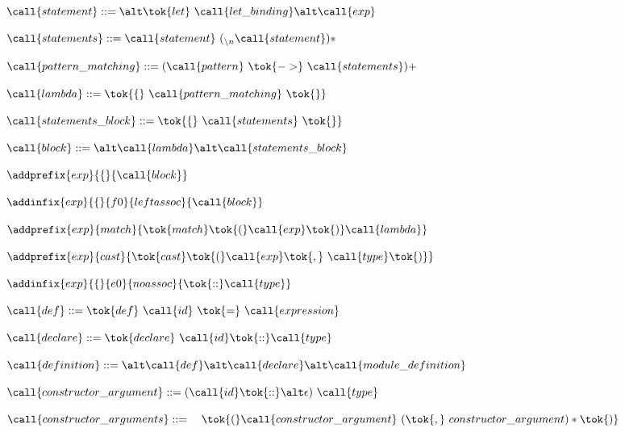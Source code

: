  
   \item $\call{statement} ::=\\
   \alt \tok{let}\ \call{let\_binding}\\
   \alt \call{exp}$
   \item $\call{statements} ::= \call{statement}\ ({}_{\backslash{}n}\call{statement})*$
   \item $\call{pattern\_matching} ::= (\call{pattern}\ \tok{->}\ \call{statements})+$

   \item $\call{lambda} ::= \tok{\{}\ \call{pattern\_matching}\ \tok{\}}$
   \item $\call{statements\_block} ::= \tok{\{}\ \call{statements}\ \tok{\}}$
   \item $\call{block} ::=\\
   \alt \call{lambda}\\
   \alt \call{statements\_block} $

   
 
   \item $\addprefix{exp}{\{}{\call{block}}$
   \item $\addinfix{exp}{\{}{f0}{leftassoc}{\call{block}}$
    
 
   \item $\addprefix{exp}{match}{\tok{match} \tok{(} \call{exp} \tok{)} \call{lambda}}$
   
 
   \item $\addprefix{exp}{cast}{\tok{cast}\tok{(} \call{exp} 
   \tok{,}\ \call{type} \tok{)}}$
    
 
   \item $\addinfix{exp}{\{}{e0}{noassoc}{\tok{::}\call{type}}$
    
 
   \item $\call{def} ::= \tok{def}\ \call{id}\ \tok{=}\ \call{expression}$
    
 
   \item $\call{declare} ::= \tok{declare}\ \call{id}\tok{::}\call{type}$
    
 
   \item $\call{definition} ::= \\
   \alt \call{def}\\
   \alt \call{declare}\\
   \alt \call{module\_definition}$
    
 
  \item $\call{constructor\_argument} ::= 
    ( \call{id} \tok{::} \alt \epsilon)\ \call{type}$
  \item $\call{constructor\_arguments} ::=\\
   \quad\tok{(} \call{constructor\_argument}\ ( \tok{,}\ {constructor\_argument} )* \tok{)}$ 
    
